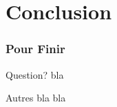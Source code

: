\section{Conclusion}
\begin{frame}
  \frametitle{\color{white}Pour Finir}
  \begin{block}{Question?}
	bla
  \end{block}
     
  \begin{block}{Autres}
  bla bla
  \end{block}
\end{frame}
        
